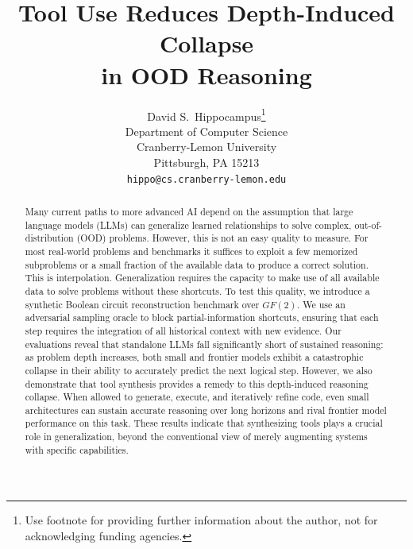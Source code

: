 \documentclass{article}
\title{Tool Use Reduces Depth-Induced Collapse \\ in OOD Reasoning}
\author{%
  David S.~Hippocampus\thanks{Use footnote for providing further information about the author, not for acknowledging funding agencies.} \\
  Department of Computer Science \\
  Cranberry-Lemon University \\
  Pittsburgh, PA 15213 \\
  \texttt{hippo@cs.cranberry-lemon.edu}
}
\begin{document}
\maketitle

\begin{abstract}


Many current paths to more advanced AI depend on the assumption that large language models (LLMs) can generalize learned relationships to solve complex, out-of-distribution (OOD) problems. However, this is not an easy quality to measure. For most real-world problems and benchmarks it suffices to exploit a few memorized subproblems or a small fraction of the available data to produce a correct solution. This is interpolation. Generalization requires the capacity to make use of all available data to solve problems without these shortcuts. To test this quality, we introduce a synthetic Boolean circuit reconstruction benchmark over $GF(2)$. We use an adversarial sampling oracle to block partial-information shortcuts, ensuring that each step requires the integration of all historical context with new evidence. Our evaluations reveal that standalone LLMs fall significantly short of sustained reasoning: as problem depth increases, both small and frontier models exhibit a catastrophic collapse in their ability to accurately predict the next logical step. However, we also demonstrate that tool synthesis provides a remedy to this depth-induced reasoning collapse. When allowed to generate, execute, and iteratively refine code, even small architectures can sustain accurate reasoning over long horizons and rival frontier model performance on this task. These results indicate that synthesizing tools plays a crucial role in generalization, beyond the conventional view of merely augmenting systems with specific capabilities.




\end{abstract}
\end{document}
